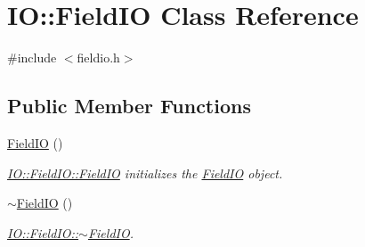 \hypertarget{class_i_o_1_1_field_i_o}{}\section{IO\+::Field\+IO Class Reference}
\label{class_i_o_1_1_field_i_o}


{\ttfamily \#include $<$fieldio.\+h$>$}

\subsection*{Public Member Functions}
\begin{DoxyCompactItemize}
\item 
\mbox{\hyperlink{class_i_o_1_1_field_i_o_a8ea52cca792b1a0f7812881b5282edf5}{Field\+IO}} ()
\begin{DoxyCompactList}\small\item\em \mbox{\hyperlink{class_i_o_1_1_field_i_o_a8ea52cca792b1a0f7812881b5282edf5}{I\+O\+::\+Field\+I\+O\+::\+Field\+IO}} initializes the \mbox{\hyperlink{class_i_o_1_1_field_i_o}{Field\+IO}} object. \end{DoxyCompactList}\item 
\mbox{\hyperlink{class_i_o_1_1_field_i_o_ae11a6e9e9a57b6f0f56718b82774af19}{$\sim$\+Field\+IO}} ()
\begin{DoxyCompactList}\small\item\em \mbox{\hyperlink{class_i_o_1_1_field_i_o_ae11a6e9e9a57b6f0f56718b82774af19}{I\+O\+::\+Field\+I\+O\+::$\sim$\+Field\+IO}}. \end{DoxyCompactList}\end{DoxyCompactItemize}
